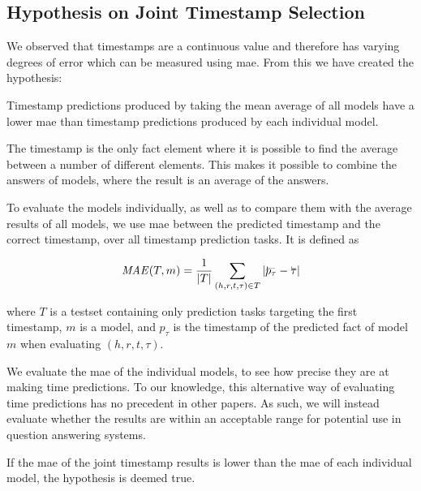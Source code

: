 \subsection{Hypothesis on Joint Timestamp Selection}
\label{sec:hypothesis_timestamp_voting}

We observed that timestamps are a continuous value and therefore has varying degrees of error which can be measured using \gls{mae}. From this we have created the hypothesis:

\begin{hypothesis}
\label{hyp:timestamp_voting}
Timestamp predictions produced by taking the mean average of all models have a lower \gls{mae} than timestamp predictions produced by each individual model.
\end{hypothesis}

The timestamp is the only fact element where it is possible to find the average between a number of different elements. This makes it possible to combine the answers of models, where the result is an average of the answers.

To evaluate the models individually, as well as to compare them with the average results of all models, we use \gls{mae} between the predicted timestamp and the correct timestamp, over all timestamp prediction tasks. It is defined as

\begin{equation}
\mathit{MAE}(T, m) = \frac{1}{|T|} \varsum_{(h, r, t, \tau) \in T} | \timebegin{p_\tau} - \timebegin{\tau} |
\end{equation}

\noindent
where $T$ is a testset containing only prediction tasks targeting the first timestamp, $m$ is a model, and $p_\tau$ is the timestamp of the predicted fact of model $m$ when evaluating $(h, r, t, \tau)$.

We evaluate the \gls{mae} of the individual models, to see how precise they are at making time predictions. To our knowledge, this alternative way of evaluating time predictions has no precedent in other papers. As such, we will instead evaluate whether the results are within an acceptable range for potential use in question answering systems.

If the \gls{mae} of the joint timestamp results is lower than the \gls{mae} of each individual model, the hypothesis is deemed true.